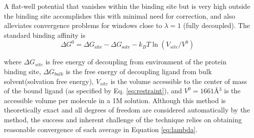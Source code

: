 \documentclass[12pt]{article}
\begin{document}
A flat-well potential that vanishes within the binding site but is very high outside the binding site accomplishes this with minimal need for correction, and also alleviates convergence problems for windows close to $\lambda=1$ (fully decoupled).  The standard binding affinity is 
		\begin{equation}
	  		\Delta G^{0}=\Delta G_{\mathrm{site}}-\Delta G_{\mathrm{solv}}-k_{B}T  \ln (V_{site} /V^{0})	\label{eq:deltag}
		\end{equation} 

		where $\Delta G_{site}$ is free energy of decoupling from environment of the protein binding site,  $\Delta G_{bulk}$ is the free energy of decoupling ligand from bulk solvent(solvation free energy), $V_{site}$ is the volume accessible to the center of mass of the bound ligand (as specified by Eq. \ref{eq:restraint}), and $V^{0} = 1661 $\AA$^{3}$ is the accessible volume per molecule in a 1M solution.  Although this method is theoretically exact and all degrees of freedom are considered automatically by the method, the success and inherent challenge of the technique relies on obtaining reasonable convergence of each average in Equation \ref{eq:lambda}. 
		
\end{document}
